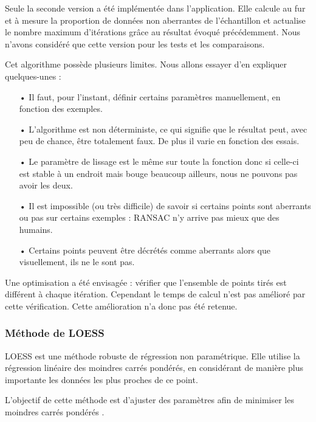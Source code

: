 \documentclass[a4paper,12pt]{article} %
\begin{document}
                    Seule la seconde version a été implémentée dans l'application. Elle calcule au fur et à mesure la proportion de données non aberrantes de l'échantillon et actualise le nombre maximum d'itérations grâce au résultat évoqué précédemment.
                    Nous n'avons considéré que cette version pour les tests et les comparaisons.
                    
                    Cet algorithme possède plusieurs limites. Nous allons essayer d'en expliquer quelques-unes :
                    \begin{itemize}
                    \item[•] Il faut, pour l'instant, définir certains paramètres manuellement, en fonction des exemples.
                    \item[•] L'algorithme est non déterministe, ce qui signifie que le résultat peut, avec peu de chance, être totalement faux. De plus il varie en fonction des essais.
                    \item[•] Le paramètre de lissage est le même sur toute la fonction donc si celle-ci est stable à un endroit mais bouge beaucoup ailleurs, nous ne pouvons pas avoir les deux. 
                    \item[•] Il est impossible (ou très difficile) de savoir si certains points sont aberrants ou pas sur certains exemples : RANSAC n'y arrive pas mieux que des humains.
                    \item[•] Certains points peuvent être décrétés comme aberrants alors que visuellement, ils ne le sont pas.
                    \end{itemize}
                    Une optimisation a été envisagée : vérifier que l'ensemble de points tirés est différent à chaque itération. Cependant le temps de calcul n'est pas amélioré par cette vérification. Cette amélioration n'a donc pas été retenue.
                    
                    
			    \subsubsection{\label{partie_loess}Méthode de LOESS}
			    
                     LOESS est une méthode robuste de régression non paramétrique. Elle utilise la régression linéaire des moindres carrés pondérés, en considérant de manière plus importante les données les plus proches de ce point.
                    
                    L'objectif de cette méthode est d'ajuster des paramètres afin de minimiser les moindres carrés pondérés \cite{LOESS1}.
                    
\end{document}
